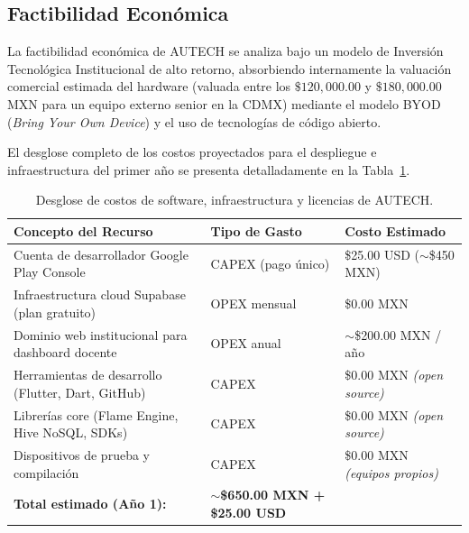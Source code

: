 \subsection{Factibilidad Económica}
\label{subsec:factibilidad_economica}

La factibilidad económica de AUTECH se analiza bajo un modelo de Inversión Tecnológica Institucional de alto retorno, absorbiendo internamente la valuación comercial estimada del hardware (valuada entre los $\$120,000.00$ y $\$180,000.00$ MXN para un equipo externo senior en la CDMX) mediante el modelo BYOD (\textit{Bring Your Own Device}) y el uso de tecnologías de código abierto.

El desglose completo de los costos proyectados para el despliegue e infraestructura del primer año se presenta detalladamente en la Tabla~\ref{tab:costos_despliegue}.

\begin{table}[htbp]
\centering
\caption{Desglose de costos de software, infraestructura y licencias de AUTECH.}
\label{tab:costos_despliegue}
\setlength{\tabcolsep}{4pt}
\renewcommand{\arraystretch}{1.2}
\scriptsize
\begin{tabularx}{\textwidth}{@{} >{\raggedright\arraybackslash}X >{\raggedright\arraybackslash}p{3cm} >{\raggedleft\arraybackslash}p{4.2cm} @{}}
\toprule
\textbf{Concepto del Recurso} &
\textbf{Tipo de Gasto} &
\textbf{Costo Estimado} \\
\midrule

Cuenta de desarrollador Google Play Console
  & CAPEX (pago único)  & \$25.00 USD (${\sim}$\$450 MXN) \\

Infraestructura cloud Supabase (plan gratuito)
  & OPEX mensual        & \$0.00 MXN \\

Dominio web institucional para dashboard docente
  & OPEX anual          & ${\sim}$\$200.00 MXN / año \\

Herramientas de desarrollo (Flutter, Dart, GitHub)
  & CAPEX               & \$0.00 MXN \textit{(open source)} \\

Librerías core (Flame Engine, Hive NoSQL, SDKs)
  & CAPEX               & \$0.00 MXN \textit{(open source)} \\

Dispositivos de prueba y compilación
  & CAPEX               & \$0.00 MXN \textit{(equipos propios)} \\

\midrule
\multicolumn{2}{@{} >{\raggedright\arraybackslash}p{10cm}}%
  {\textbf{Total estimado (Año 1):}} &
  ${\sim}$\textbf{\$650.00 MXN + \$25.00 USD} \\

\bottomrule
\end{tabularx}
\end{table}

